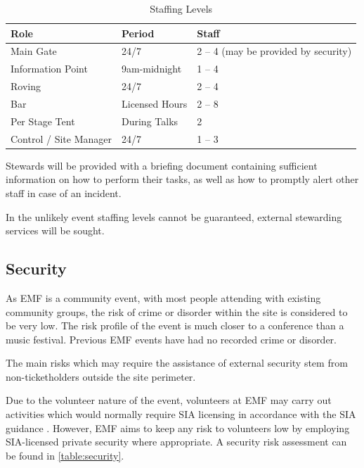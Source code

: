\begin{table}[h!]
    \caption{Staffing Levels}
    \label{table:staff}
    \centering
    \begin{tabular}{| l l l |}
        \hline
        \textbf{Role}          & \textbf{Period} & \textbf{Staff}                       \\
        \hline
        Main Gate              & 24/7            & 2 -- 4 (may be provided by security) \\
        Information Point      & 9am-midnight    & 1 -- 4                               \\
        Roving                 & 24/7            & 2 -- 4                               \\
        Bar                    & Licensed Hours  & 2 -- 8                               \\
        Per Stage Tent         & During Talks    & 2                                    \\
        Control / Site Manager & 24/7            & 1 -- 3                               \\
        \hline
    \end{tabular}
\end{table}

Stewards will be provided with a briefing document containing sufficient information on how to perform
their tasks, as well as how to promptly alert other staff in case of an incident.

In the unlikely event staffing levels cannot be guaranteed, external stewarding services will be sought.

\subsection{Security}

As EMF is a community event, with most people attending with existing community groups, the risk of crime
or disorder within the site is considered to be very low. The risk profile of the event is much closer
to a conference than a music festival. Previous EMF events have had no recorded crime or disorder.

The main risks which may require the assistance of external security stem from non-ticketholders outside
the site perimeter.

Due to the volunteer nature of the event, volunteers at EMF may carry out activities which would normally
require SIA licensing in accordance with the SIA guidance \cite{sia}. However, EMF aims to keep any risk
to volunteers low by employing SIA-licensed private security where appropriate. A security risk assessment
can be found in \cref{table:security}.

